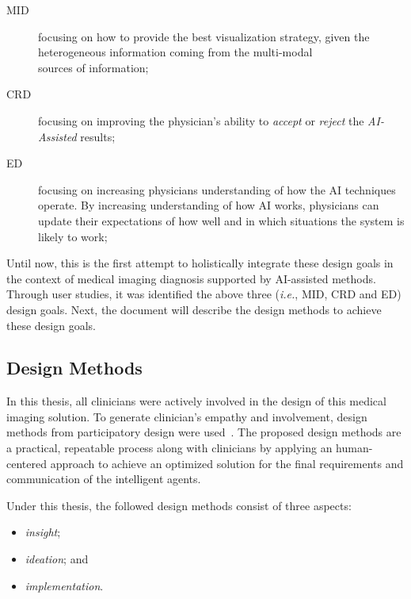 \begin{description}
\item[\ac{MID}] focusing on how to provide the best visualization strategy, given the heterogeneous information coming from the multi-modal \\ sources of information;

\item[\ac{CRD}] focusing on improving the physician's ability to {\it accept} or {\it reject} the {\it AI-Assisted} results;

\item[\ac{ED}] focusing on increasing physicians understanding of how the AI techniques operate. By increasing understanding of how AI works, physicians can update their expectations of how well and in which situations the system is likely to work;
\end{description}

\hfill

Until now, this is the first attempt to holistically integrate these design goals in the context of medical imaging diagnosis supported by \ac{AI}-assisted methods.
Through user studies, it was identified the above three ({\it i.e.}, \ac{MID}, \ac{CRD} and \ac{ED}) design goals.
Next, the document will describe the design methods to achieve these design goals.

\subsection{Design Methods}
\label{sec:chap005003003}

In this thesis, all clinicians were actively involved in the design of this medical imaging solution.
To generate clinician's empathy and involvement, design methods from participatory design were used~\cite{10.1145/3308558.3314123}.
The proposed design methods are a practical, repeatable process along with clinicians by applying an human-centered approach to achieve an optimized solution for the final requirements and communication of the intelligent agents.

\hfill

\noindent
Under this thesis, the followed design methods consist of three aspects:

\begin{itemize}
\item {\it insight};
\item {\it ideation}; and
\item {\it implementation}.
\end{itemize}

